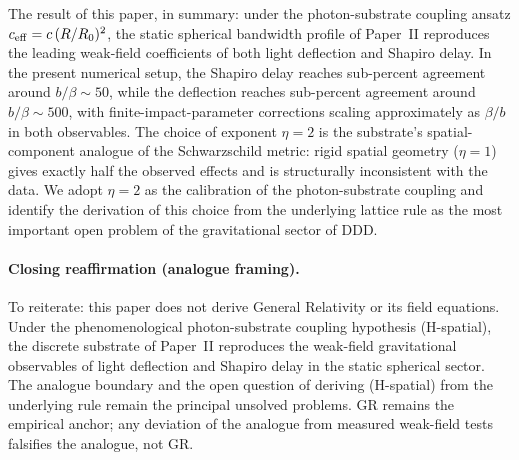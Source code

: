 \documentclass[11pt,a4paper]{article}
\begin{document}
The result of this paper, in summary: under the photon-substrate
coupling ansatz $c_{\rm eff} = c\,(R/R_0)^2$, the static
spherical bandwidth profile of Paper~II reproduces the leading
weak-field coefficients of both light deflection and Shapiro
delay. In the present numerical setup, the Shapiro delay
reaches sub-percent agreement around $b/\beta \sim 50$, while
the deflection reaches sub-percent agreement around
$b/\beta \sim 500$, with finite-impact-parameter corrections
scaling approximately as $\beta/b$ in both observables. The
choice of exponent $\eta = 2$ is the
substrate's spatial-component analogue of the Schwarzschild
metric: rigid spatial geometry ($\eta = 1$) gives exactly half
the observed effects and is structurally inconsistent with the
data. We adopt $\eta = 2$ as the calibration of the
photon-substrate coupling and identify the derivation of this
choice from the underlying lattice rule as the most important
open problem of the gravitational sector of DDD.





\paragraph{Closing reaffirmation (analogue framing).}
To reiterate: this paper does not derive General Relativity or
its field equations. Under the phenomenological photon-substrate
coupling hypothesis (H-spatial), the discrete substrate of
Paper~II reproduces the weak-field gravitational observables
of light deflection and Shapiro delay in the static spherical
sector. The analogue boundary and the open question of deriving
(H-spatial) from the underlying rule remain the principal
unsolved problems. GR remains the empirical anchor; any
deviation of the analogue from measured weak-field tests
falsifies the analogue, not GR.
\end{document}
